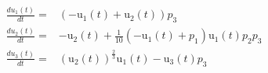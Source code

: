 \begin{align}
\frac{du_1(t)}{dt} =& \left(  - \mathrm{u_1}\left( t \right) + \mathrm{u_2}\left( t \right) \right) p_3 \\
\frac{du_2(t)}{dt} =&  - \mathrm{u_2}\left( t \right) + \frac{1}{10} \left(  - \mathrm{u_1}\left( t \right) + p_1 \right) \mathrm{u_1}\left( t \right) p_2 p_3 \\
\frac{du_3(t)}{dt} =& \left( \mathrm{u_2}\left( t \right) \right)^{\frac{2}{3}} \mathrm{u_1}\left( t \right) - \mathrm{u_3}\left( t \right) p_3
\end{align}
